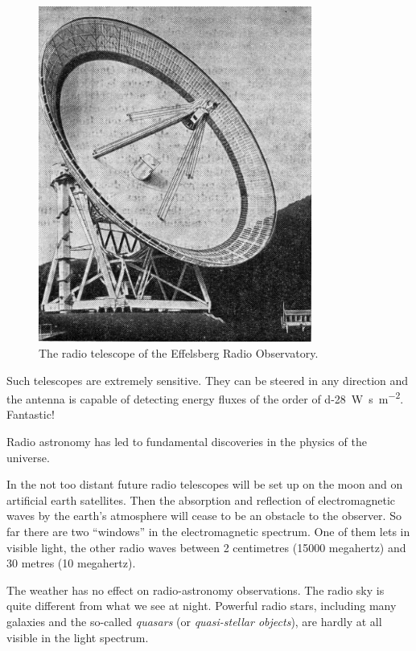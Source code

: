\begin{figure}[!ht]
\centering
\includegraphics[width=0.8\textwidth]{figures/fig-07-04.jpg}
\caption{The radio telescope of the Effelsberg Radio Observatory.}
\label{fig-7.4}
\end{figure}


Such telescopes are extremely sensitive. They can be steered in any direction and the antenna is capable of detecting energy fluxes of the order of \SI{d-28}{\watt\second\per\metre\squared}. Fantastic!

Radio astronomy has led to fundamental discoveries in the physics of the universe.

In the not too distant future radio telescopes will be set up on the moon and on artificial earth satellites. Then the absorption and reflection of electromagnetic waves by the earth’s atmosphere will cease to be an ob­stacle to the observer. So far there are two ``windows'' in the electromagnetic spectrum. One of them lets in visible light, the other radio waves between 2 centimetres (15000 megahertz) and 30 metres (10 megahertz).

The weather has no effect on radio-astronomy observa­tions. The radio sky is quite different from what we see at night. Powerful radio stars, including many galaxies and the so-called \emph{quasars} (or \emph{quasi-stellar objects}), are hardly at all visible in the light spectrum.

